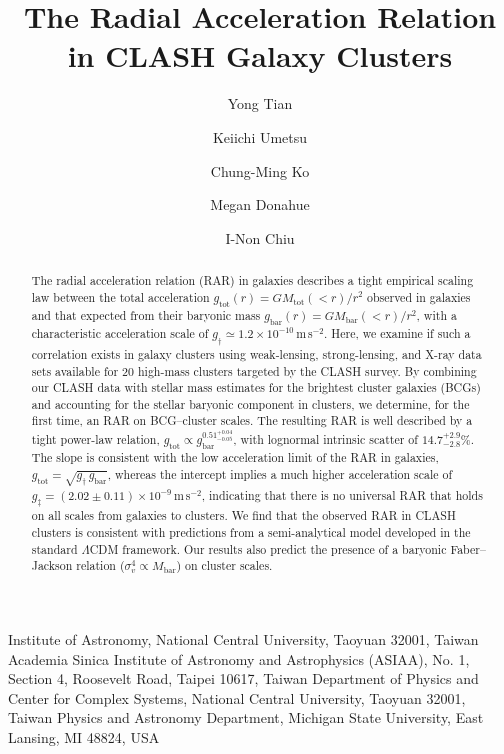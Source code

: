 \documentclass[a4paper,iop,twocolumn,twocolappendix,numberedappendix,appendixfloats]{emulateapj}
\newcommand{\percent}{\ensuremath{\%}}
\newcommand{\Mtot}{M_\mathrm{tot}}
\newcommand{\Mbar}{M_\mathrm{bar}}
\newcommand{\gbar}{g_\mathrm{bar}}
\newcommand{\gtot}{g_\mathrm{tot}}
\begin{document}
\nocite{*}

\title{The Radial Acceleration Relation in CLASH Galaxy Clusters}
\author{Yong Tian}
\author{Keiichi Umetsu}
\author{Chung-Ming Ko}
\author{Megan Donahue}
\author{I-Non Chiu}

 {Institute of Astronomy, National Central University, Taoyuan 32001,
 Taiwan}
 {Academia Sinica Institute of Astronomy and Astrophysics (ASIAA),
 No. 1, Section 4, Roosevelt Road, Taipei 10617, Taiwan}
 {Department of Physics and Center for Complex Systems, National Central University, Taoyuan 32001, Taiwan}
 {Physics and Astronomy Department, Michigan State University, East Lansing, MI 48824, USA}

\begin{abstract}
The radial acceleration relation (RAR) in galaxies describes a tight
 empirical scaling law between the total acceleration
 $\gtot(r)=G\Mtot(<r)/r^2$
 observed in galaxies and that expected from their baryonic mass
 $\gbar(r)=G\Mbar(<r)/r^2$,
 with a characteristic acceleration scale of
 $g_\dag\simeq 1.2\times 10^{-10}$\,m\,s$^{-2}$.
Here, we examine if such a correlation exists in galaxy clusters using
 weak-lensing, strong-lensing, and X-ray data sets available for 20
 high-mass clusters targeted by the CLASH survey.
By combining our CLASH data with stellar mass estimates for the
 brightest cluster galaxies (BCGs) and accounting for the stellar
 baryonic component in clusters, we determine, for the first time,
 an RAR on BCG--cluster scales.
The resulting RAR is well described by a tight power-law relation,
 $\gtot\propto \gbar^{0.51^{+0.04}_{-0.05}}$, with lognormal intrinsic
 scatter of $14.7^{+2.9}_{-2.8}\percent$.
The slope is consistent with the low acceleration limit of the
 RAR in galaxies, $\gtot=\sqrt{g_\dag\,\gbar}$,
 whereas the intercept implies a much higher acceleration scale
 of $g_\ddag = (2.02\pm0.11)\times 10^{-9}$\,m\,s$^{-2}$,
 indicating that there is no universal RAR that holds on all scales from
 galaxies to clusters.
We find that the observed RAR in CLASH clusters is consistent with
 predictions from a semi-analytical model developed in the
 standard $\Lambda$CDM framework.
Our results also predict the presence of a baryonic Faber--Jackson
 relation ($\sigma_v^4\propto M_\mathrm{bar}$) on cluster
 scales.
\end{abstract}
\end{document}
